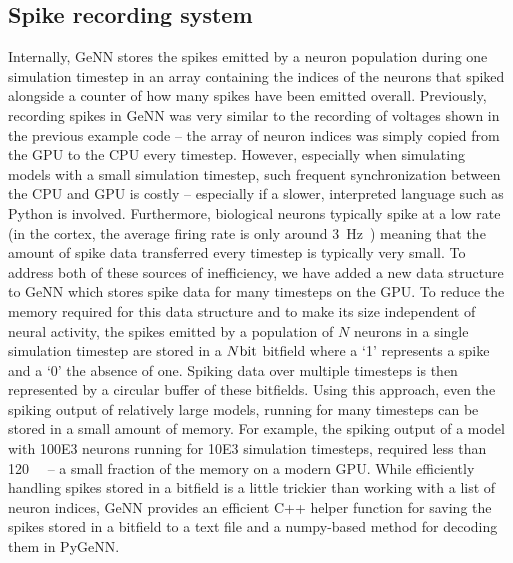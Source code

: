 \documentclass[utf8]{frontiersSCNS} %
\begin{document}
\subsection{Spike recording system}
\label{sec:methods/spike_recording}
Internally, GeNN stores the spikes emitted by a neuron population during one simulation timestep in an array containing the indices of the neurons that spiked alongside a counter of how many spikes have been emitted overall.
Previously, recording spikes in GeNN was very similar to the recording of voltages shown in the previous example code -- the array of neuron indices was simply copied from the GPU to the CPU every timestep.
However, especially when simulating models with a small simulation timestep, such frequent synchronization between the CPU and GPU is costly -- especially if a slower, interpreted language such as Python is involved.
Furthermore, biological neurons typically spike at a low rate (in the cortex, the average firing rate is only around \SI{3}{\hertz}~\citep{Buzsaki2014}) meaning that the amount of spike data transferred every timestep is typically very small.
To address both of these sources of inefficiency, we have added a new data structure to GeNN which stores spike data for many timesteps on the GPU.
To reduce the memory required for this data structure and to make its size independent of neural activity, the spikes emitted by a population of $N$ neurons in a single simulation timestep are stored in a $N\si{\bit}$ bitfield where a `1' represents a spike and a `0' the absence of one.
Spiking data over multiple timesteps is then represented by a circular buffer of these bitfields.
Using this approach, even the spiking output of relatively large models, running for many timesteps can be stored in a small amount of memory.
For example, the spiking output of a model with \num{100E3} neurons running for \num{10E3} simulation timesteps, required less than \SI{120}{\mega\byte} -- a small fraction of the memory on a modern GPU.
While efficiently handling spikes stored in a bitfield is a little trickier than working with a list of neuron indices, GeNN provides an efficient C++ helper function for saving the spikes stored in a bitfield to a text file and a numpy-based method for decoding them in PyGeNN. 
\end{document}
